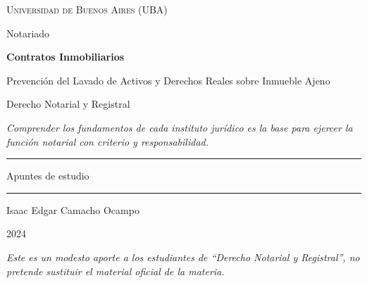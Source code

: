 \documentclass[12pt,oneside]{book}
\newcommand{\universidad}{Universidad de Buenos Aires (UBA)}
\newcommand{\carrera}{Notariado}
\newcommand{\materia}{Derecho Notarial y Registral}
\newcommand{\titulo}{Contratos Inmobiliarios}
\newcommand{\subtituloapunte}{Prevención del Lavado de Activos y Derechos Reales sobre Inmueble Ajeno}
\newcommand{\autor}{Isaac Edgar Camacho Ocampo}
\newcommand{\anio}{2024}
\begin{document}
\begin{titlepage}
\thispagestyle{empty}

\begin{center}

\vspace*{1cm}

{\large \textsc{\universidad}}

\vspace{0.2cm}

{\large \carrera}

\vspace{3cm}

{\Huge \textbf{\titulo}}

\vspace{0.6cm}

{\LARGE \subtituloapunte}

\vspace{0.8cm}

{\large \materia}

\vspace{1cm}

\textit{Comprender los fundamentos de cada instituto jurídico es la base para ejercer la función notarial con criterio y responsabilidad.}

\vspace{1.2cm}

\rule{0.70\textwidth}{0.5pt}

\vspace{0.5cm}

{\large Apuntes de estudio}

\vspace{0.5cm}

\rule{0.70\textwidth}{0.5pt}

\vfill

{\large \autor}

\vspace{0.3cm}

{\large \anio}

\end{center}

\vfill

\begin{flushleft}
\textit{Este es un modesto aporte a los estudiantes de ``Derecho Notarial y Registral'', no pretende sustituir el material oficial de la materia.}
\end{flushleft}

\end{titlepage}
\end{document}
